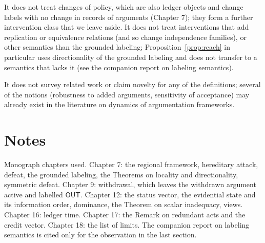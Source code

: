 \documentclass[11pt]{article}
\theoremstyle{plain}
\theoremstyle{definition}
\theoremstyle{remark}
\newcommand{\OUT}{\textsf{OUT}}
\begin{document}
It does not treat changes of policy, which are also ledger objects and change labels with no change in records of arguments (Chapter 7); they form a further intervention class that we leave aside. It does not treat interventions that add replication or equivalence relations (and so change independence families), or other semantics than the grounded labeling; Proposition~\ref{prop:reach} in particular uses directionality of the grounded labeling and does not transfer to a semantics that lacks it (see the companion report on labeling semantics).

It does not survey related work or claim novelty for any of the definitions; several of the notions (robustness to added arguments, sensitivity of acceptance) may already exist in the literature on dynamics of argumentation frameworks.

\section*{Notes}

Monograph chapters used. Chapter 7: the regional framework, hereditary attack, defeat, the grounded labeling, the Theorems on locality and directionality, symmetric defeat. Chapter 9: withdrawal, which leaves the withdrawn argument active and labelled $\OUT$. Chapter 12: the status vector, the evidential state and its information order, dominance, the Theorem on scalar inadequacy, views. Chapter 16: ledger time. Chapter 17: the Remark on redundant acts and the credit vector. Chapter 18: the list of limits. The companion report on labeling semantics is cited only for the observation in the last section.
\end{document}
